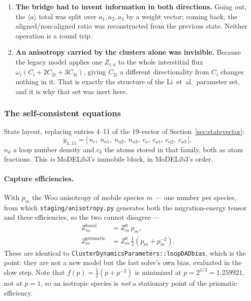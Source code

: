 \documentclass[11pt]{article}
\newcommand{\aloop}{\ensuremath{\langle a\rangle}}
\newcommand{\MoD}{\textsf{MoDELib3}}
\newcommand{\code}[1]{\texttt{\small #1}}
\begin{document}
\begin{enumerate}
\item \textbf{The bridge had to invent information in both directions.} Going
      out, the \aloop{} total was split over $a_1,a_2,a_3$ by a weight vector;
      coming back, the aligned/non-aligned ratio was reconstructed from the
      previous state. Neither operation is a round trip.
\item \textbf{An anisotropy carried by the clusters alone was invisible.}
      Because the legacy model applies one $Z_{i,a}$ to the whole interstitial
      flux $\omega_i(C_i + 2C_{2i} + 3C_{3i})$, giving $C_{2i}$ a different
      directionality from $C_i$ changes nothing in it. That is exactly the
      structure of the Li~et~al.\ parameter set, and it is why that set was
      inert here.
\end{enumerate}

\subsubsection{The self-consistent equations}

State layout, replacing entries 4--11 of the 19-vector of
Section~\ref{sec:statevector}:
%
\begin{equation}
y_{4..11} = \bigl[\,n_c,\ n_{a1},\ n_{a2},\ n_{a3},\
                    c_c,\ c_{a1},\ c_{a2},\ c_{a3}\,\bigr],
\end{equation}
%
$n_k$ a loop number density and $c_k$ the atoms stored in that family, both as
atom fractions. This \emph{is} \MoD{}'s immobile block, in \MoD{}'s order.

\paragraph{Capture efficiencies.} With $p_m$ the Woo anisotropy of mobile
species $m$ --- one number per species, from which
\code{staging/anisotropy.py} generates both the migration-energy tensor and
these efficiencies, so the two cannot disagree ---
%
\begin{align}
  Z^{\text{basal}}_{m}      &= Z^{0}_{m}\, p_m ,
  \label{eq:Zbasal}\\
  Z^{\text{prismatic}}_{m}  &= Z^{0}_{m}\,
      \tfrac{1}{2}\!\left(p_m + p_m^{-2}\right).
  \label{eq:Zprism}
\end{align}
%
These are identical to \code{ClusterDynamicsParameters::loopDADbias}, which is
the point: they are not a new model but the fast solve's own bias, evaluated in
the slow step. Note that $f(p)=\tfrac12(p+p^{-2})$ is minimized at
$p=2^{1/3}=1.259921$, not at $p=1$, so an isotropic species is \emph{not} a
stationary point of the prismatic efficiency.
\end{document}

